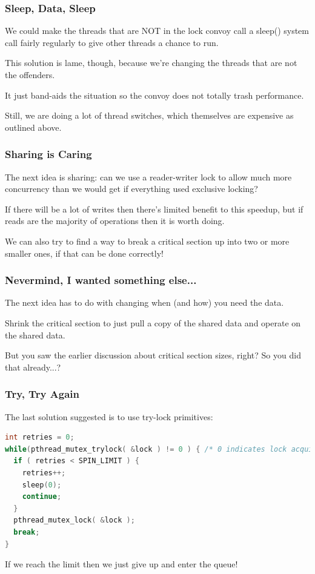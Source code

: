 \begin{frame}
\frametitle{Sleep, Data, Sleep}

We could make the threads that are NOT in the lock convoy call a sleep() system call fairly regularly to give other threads a chance to run. 

This solution is lame, though, because we're changing the threads that are not the offenders.

It just band-aids the situation so the convoy does not totally trash performance. 

Still, we are doing a lot of thread switches, which themselves are expensive as outlined above.

\end{frame}


\begin{frame}
\frametitle{Sharing is Caring}

The next idea is sharing: can we use a reader-writer lock to allow much more concurrency than we would get if everything used exclusive locking? 

If there will be a lot of writes then there's limited benefit to this speedup, but if reads are the majority of operations then it is worth doing. 

We can also try to find a way to break a critical section up into two or more smaller ones, if that can be done correctly!

\end{frame}

\begin{frame}
\frametitle{Nevermind, I wanted something else...}

The next idea has to do with changing when (and how) you need the data. 

Shrink the critical section to just pull a copy of the shared data and operate on the shared data. 
 
 
But you saw the earlier discussion about critical section sizes, right? So you did that already...?


\end{frame} 


\begin{frame}[fragile]
\frametitle{Try, Try Again}

The last solution suggested is to use try-lock primitives:

\begin{lstlisting}[language=C]
int retries = 0;
while(pthread_mutex_trylock( &lock ) != 0 ) { /* 0 indicates lock acquired */
  if ( retries < SPIN_LIMIT ) {
    retries++;
    sleep(0);
    continue;
  }
  pthread_mutex_lock( &lock );
  break;
}
\end{lstlisting}

If we reach the limit then we just give up and enter the queue!

\end{frame}



